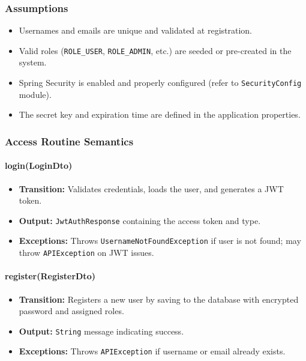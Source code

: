 \documentclass[12pt, titlepage]{article}
\begin{document}
\subsubsection{Assumptions}
\begin{itemize}
    \item Usernames and emails are unique and validated at registration.
    \item Valid roles (\verb|ROLE_USER|, \verb|ROLE_ADMIN|, etc.) are seeded or pre-created in the system.
    \item Spring Security is enabled and properly configured (refer to \texttt{SecurityConfig} module).
    \item The secret key and expiration time are defined in the application properties.
\end{itemize}

\subsubsection{Access Routine Semantics}

\paragraph{login(LoginDto)}
\begin{itemize}
    \item \textbf{Transition:} Validates credentials, loads the user, and generates a JWT token.
    \item \textbf{Output:} \texttt{JwtAuthResponse} containing the access token and type.
    \item \textbf{Exceptions:} Throws \texttt{UsernameNotFoundException} if user is not found; may throw \texttt{APIException} on JWT issues.
\end{itemize}

\paragraph{register(RegisterDto)}
\begin{itemize}
    \item \textbf{Transition:} Registers a new user by saving to the database with encrypted password and assigned roles.
    \item \textbf{Output:} \texttt{String} message indicating success.
    \item \textbf{Exceptions:} Throws \texttt{APIException} if username or email already exists.
\end{itemize}
\end{document}
